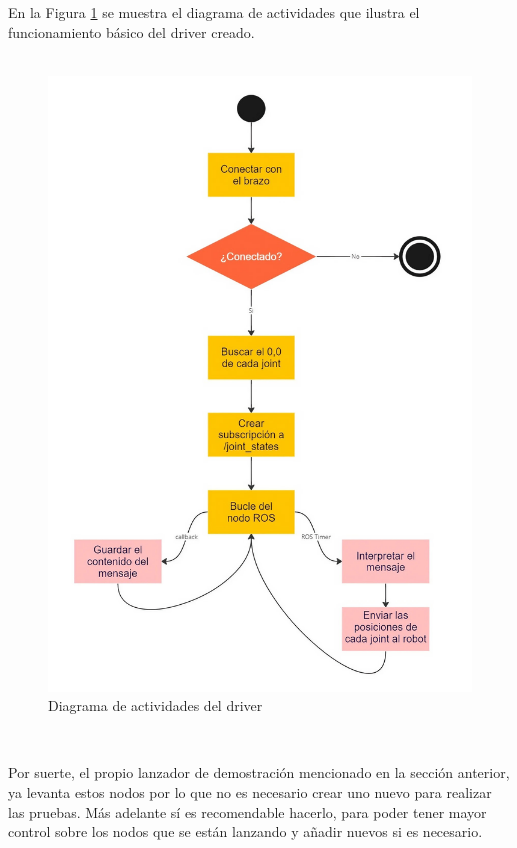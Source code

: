 En la Figura \ref{fig:dia_driver1} se muestra el diagrama de actividades que ilustra el funcionamiento básico del driver creado.\\
\\


\begin{figure} [ht!]
    \begin{center}
      \includegraphics[width=12cm]{figs/driver_diagram1.jpg}
    \end{center}
    \caption{Diagrama de actividades del driver}
    \label{fig:dia_driver1}
\end{figure}\ 


Por suerte, el propio lanzador de demostración mencionado en la sección anterior, ya levanta estos nodos por lo que no es necesario crear 
uno nuevo para realizar las pruebas. Más adelante sí es recomendable hacerlo, para poder tener mayor control sobre los nodos 
que se están lanzando y añadir nuevos si es necesario.
\\

